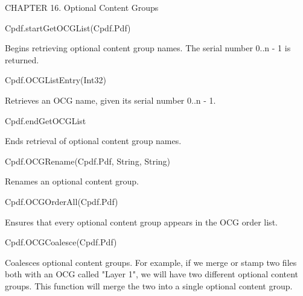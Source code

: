CHAPTER 16. Optional Content Groups

Cpdf.startGetOCGList(Cpdf.Pdf)

Begins retrieving optional content group names. The serial number 0..n - 1 is
returned.

Cpdf.OCGListEntry(Int32)

Retrieves an OCG name, given its serial number 0..n - 1.

Cpdf.endGetOCGList

Ends retrieval of optional content group names.

Cpdf.OCGRename(Cpdf.Pdf, String, String)

Renames an optional content group.

Cpdf.OCGOrderAll(Cpdf.Pdf)

Ensures that every optional content group appears in the OCG order list.

Cpdf.OCGCoalesce(Cpdf.Pdf)

Coalesces optional content groups. For example, if we merge or stamp two files
both with an OCG called "Layer 1", we will have two different optional content
groups. This function will merge the two into a single optional content group.
